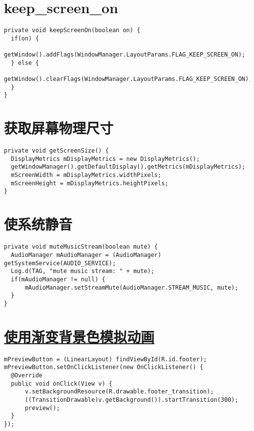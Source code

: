 \section[keep\_screen\_on]{keep\_screen\_on}
\begin{verbatim}
private void keepScreenOn(boolean on) {
  if(on) {
      getWindow().addFlags(WindowManager.LayoutParams.FLAG_KEEP_SCREEN_ON);
  } else {
      getWindow().clearFlags(WindowManager.LayoutParams.FLAG_KEEP_SCREEN_ON);
  }
}
\end{verbatim}

\section[获取屏幕物理尺寸]{获取屏幕物理尺寸}
\begin{verbatim}
private void getScreenSize() {
  DisplayMetrics mDisplayMetrics = new DisplayMetrics();
  getWindowManager().getDefaultDisplay().getMetrics(mDisplayMetrics);
  mScreenWidth = mDisplayMetrics.widthPixels;
  mScreenHeight = mDisplayMetrics.heightPixels;
}
\end{verbatim}

\section[使系统静音]{使系统静音}
\begin{verbatim}
private void muteMusicStream(boolean mute) {
  AudioManager mAudioManager = (AudioManager) getSystemService(AUDIO_SERVICE);
  Log.d(TAG, "mute music stream: " + mute);
  if(mAudioManager != null) {
      mAudioManager.setStreamMute(AudioManager.STREAM_MUSIC, mute);
  }
}
\end{verbatim}

\section[使用渐变背景色模拟动画]{\underline{使用渐变背景色模拟动画}}
\begin{verbatim}
mPreviewButton = (LinearLayout) findViewById(R.id.footer);
mPreviewButton.setOnClickListener(new OnClickListener() {
  @Override
  public void onClick(View v) {
      v.setBackgroundResource(R.drawable.footer_transition);
      ((TransitionDrawable)v.getBackground()).startTransition(300);
      preview();
  }
});
\end{verbatim}

